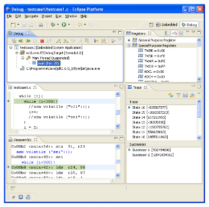 \begin{block}{\large {}\vphantom{Applications}}
\begin{columns}[T]
\begin{column}{0.3\linewidth}
\begin{figure}
    \includegraphics[scale=0.7]{figures/eclipse.jpg}
  \end{figure}
\end{column}
\begin{column}{0.02\linewidth}\end{column}
\end{columns}
\end{block}
